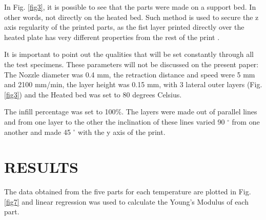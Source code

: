 \documentclass[10pt,fleqn,a4paper,twoside]{article}
\begin{document}
In Fig. \ref{fig3}, it is possible to see that the parts were made on a support bed. In other words, not directly on the heated bed. Such method is used to secure the z axis regularity of the printed parts, as the fist layer printed directly over the heated plate has very different properties from the rest of the print \citep{PETG}. 

It is important to point out the qualities that will be set constantly through all the test specimens. These parameters will not be discussed on the present paper: The Nozzle diameter was 0.4 mm, the retraction distance and speed were 5 mm and 2100 mm/min, the layer height was 0.15 mm, with 3 lateral outer layers (Fig.\ref{fig3}) and the Heated bed was set to 80 degrees Celsius.

The infill percentage was set to 100\%. The layers were made out of parallel lines and from one layer to the other the inclination of these lines varied 90 $^\circ$ from one another and made 45 $^\circ$ with the y axis of the print.









%



\section{RESULTS}
The data obtained from the five parts for each temperature are plotted in Fig.\ref{fig7} and linear regression was used to calculate the Young's Modulus of each part.
\end{document}
